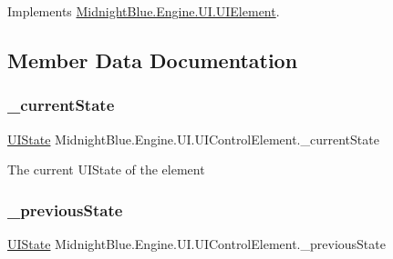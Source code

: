 Implements \hyperlink{class_midnight_blue_1_1_engine_1_1_u_i_1_1_u_i_element_a5b2bff6eed644fc33bc3e1ffaa8bfc70}{Midnight\+Blue.\+Engine.\+U\+I.\+U\+I\+Element}.



\subsection{Member Data Documentation}
\hypertarget{class_midnight_blue_1_1_engine_1_1_u_i_1_1_u_i_control_element_a8c79233eae8b09a824db91ca73d7f1d0}{}\label{class_midnight_blue_1_1_engine_1_1_u_i_1_1_u_i_control_element_a8c79233eae8b09a824db91ca73d7f1d0} 
\subsubsection{\texorpdfstring{\+\_\+current\+State}{\_currentState}}
{\footnotesize\ttfamily \hyperlink{namespace_midnight_blue_1_1_engine_1_1_u_i_ac8cda7dc9a469f43de5392ebb537ff92}{U\+I\+State} Midnight\+Blue.\+Engine.\+U\+I.\+U\+I\+Control\+Element.\+\_\+current\+State\hspace{0.3cm}{\ttfamily [protected]}}



The current U\+I\+State of the element 

\hypertarget{class_midnight_blue_1_1_engine_1_1_u_i_1_1_u_i_control_element_a0cfd06330f4957bca2d8fdd1ae6343c1}{}\label{class_midnight_blue_1_1_engine_1_1_u_i_1_1_u_i_control_element_a0cfd06330f4957bca2d8fdd1ae6343c1} 
\subsubsection{\texorpdfstring{\+\_\+previous\+State}{\_previousState}}
{\footnotesize\ttfamily \hyperlink{namespace_midnight_blue_1_1_engine_1_1_u_i_ac8cda7dc9a469f43de5392ebb537ff92}{U\+I\+State} Midnight\+Blue.\+Engine.\+U\+I.\+U\+I\+Control\+Element.\+\_\+previous\+State\hspace{0.3cm}{\ttfamily [protected]}}




